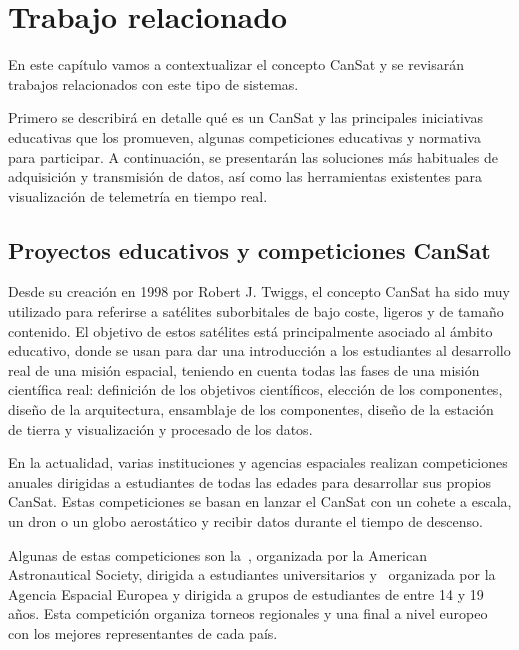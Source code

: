 \chapter{Trabajo relacionado}
\label{cap:trabajorRelacionado}
En este capítulo vamos a contextualizar el concepto CanSat y se revisarán trabajos relacionados con este tipo de sistemas.

Primero se describirá en detalle qué es un CanSat y las principales iniciativas educativas que los promueven,
algunas competiciones educativas y normativa para participar.
%
A continuación, se presentarán las soluciones más habituales de adquisición y transmisión de datos, así como las herramientas existentes para visualización de telemetría en tiempo real.


\section{Proyectos educativos y competiciones CanSat}
Desde su creación en 1998 por Robert J. Twiggs, el concepto CanSat ha sido muy utilizado para referirse a satélites suborbitales de bajo coste,
ligeros y de tamaño contenido.
El objetivo de estos satélites está principalmente asociado al ámbito educativo, donde se usan para dar una introducción a los estudiantes al desarrollo real de una misión espacial,
teniendo en cuenta todas las fases de una misión científica real: definición de los objetivos científicos, elección de los componentes, diseño de la arquitectura, ensamblaje de los componentes,
diseño de la estación de tierra y visualización y procesado de los datos.

En la actualidad, varias instituciones y agencias espaciales realizan competiciones anuales dirigidas a estudiantes de todas las edades para desarrollar sus propios CanSat.
Estas competiciones se basan en lanzar el CanSat con un cohete a escala, un dron o un globo aerostático y recibir datos durante el tiempo de descenso.

Algunas de estas competiciones son la~\cite{cansatcompetition2025}, organizada por la American Astronautical Society, dirigida a estudiantes universitarios
y~\cite{esa_cansat2025} organizada por la Agencia Espacial Europea y dirigida a grupos de estudiantes de entre 14 y 19 años.
Esta competición organiza torneos regionales y una final a nivel europeo con los mejores representantes de cada país.

